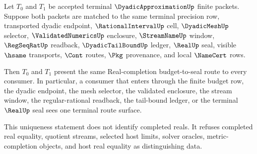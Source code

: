 \begin{theorem}
\label{thm:dyadic-approximation-terminal-budget-seal-uniqueness}
Let $T_0$ and $T_1$ be accepted terminal $\DyadicApproximationUp$ finite packets. Suppose both packets are matched to the same terminal precision row, transported dyadic endpoint, $\RationalIntervalUp$ cell, $\DyadicMeshUp$ selector, $\ValidatedNumericsUp$ enclosure, $\StreamNameUp$ window, $\RegSeqRatUp$ readback, $\DyadicTailBoundUp$ ledger, $\RealUp$ seal, visible $\hsame$ transports, $\Cont$ routes, $\Pkg$ provenance, and local $\NameCert$ rows.

Then $T_0$ and $T_1$ present the same Real-completion budget-to-seal route to every consumer. In particular, a consumer that enters through the finite budget row, the dyadic endpoint, the mesh selector, the validated enclosure, the stream window, the regular-rational readback, the tail-bound ledger, or the terminal $\RealUp$ seal sees one terminal route surface.

This uniqueness statement does not identify completed reals. It refuses completed real equality, quotient streams, selected host limits, solver oracles, metric-completion objects, and host real equality as distinguishing data.
\end{theorem}
